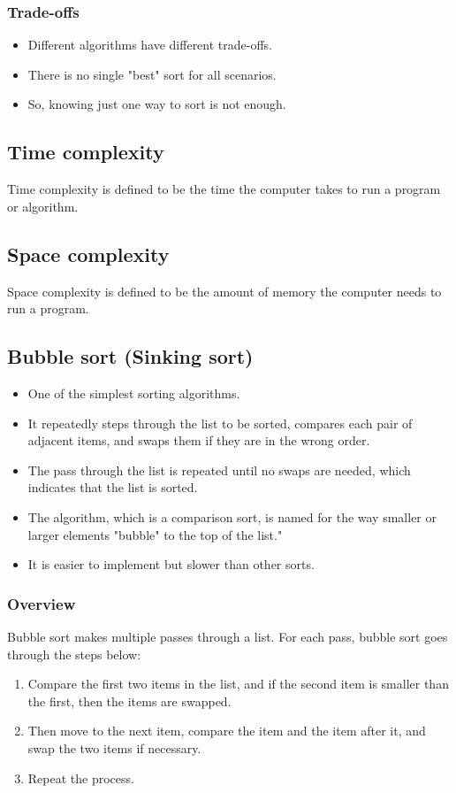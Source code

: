 \documentclass[11pt]{article}
\begin{document}
\subsubsection{Trade-offs}
\label{sec:orgbfee841}
\begin{itemize}
\item Different algorithms have different trade-offs.
\item There is no single "best" sort for all scenarios.
\item So, knowing just one way to sort is not enough.
\end{itemize}

\subsection{Time complexity}
\label{sec:org4dd228c}
Time complexity is defined to be the time the computer takes to run a program or algorithm.

\subsection{Space complexity}
\label{sec:org3bfa673}
Space complexity is defined to be the amount of memory the computer needs to run a program.

\subsection{Bubble sort (Sinking sort)}
\label{sec:org3a18bf9}
\begin{itemize}
\item One of the simplest sorting algorithms.
\item It repeatedly steps through the list to be sorted, compares each pair of adjacent items, and swaps them if they are in the wrong order.
\item The pass through the list is repeated until no swaps are needed, which indicates that the list is sorted.
\item The algorithm, which is a comparison sort, is named for the way smaller or larger elements "bubble" to the top of the list."
\item It is easier to implement but slower than other sorts.
\end{itemize}

\subsubsection{Overview}
\label{sec:org8478333}
Bubble sort makes multiple passes through a list. For each pass, bubble sort goes through the steps below:
\begin{enumerate}
\item Compare the first two items in the list, and if the second item is smaller than the first, then the items are swapped.
\item Then move to the next item, compare the item and the item after it, and swap the two items if necessary.
\item Repeat the process.
\end{enumerate}
\end{document}
